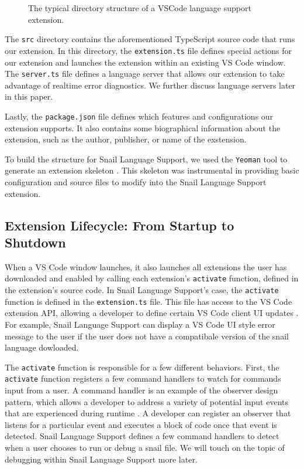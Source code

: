 \documentclass{article}
\begin{document}
\begin{figure}
\begin{center}
        \caption{
            \centering 
                The typical directory structure of a VSCode language support extension.
        }
        \label{fig:directory-structure}
    \end{center}
\end{figure}

The \lstinline{src} directory contains the aforementioned TypeScript source code that runs our extension. In this directory, the \lstinline{extension.ts} file defines special actions for our extension and launches the extension within an existing VS Code window. The \lstinline{server.ts} file defines a language server that allows our extension to take advantage of realtime error diagnostics. We further discuss language servers later in this paper. 

Lastly, the \lstinline{package.json} file defines which features and configurations our extension supports. It also contains some biographical information about the extension, such as the author, publisher, or name of the exstension. 

To build the structure for Snail Language Support, we used the \lstinline{Yeoman} tool to generate an extension skeleton \cite{Yeoman_2023}. This skeleton was instrumental in providing basic configuration and source files to modify into the Snail Language Support extension.

\subsection{Extension Lifecycle: From Startup to Shutdown}

When a VS Code window launches, it also launches all extensions the user has downloaded and enabled by calling each extension's \lstinline{activate} function, defined in the extension's source code. In Snail Language Support's case, the \lstinline{activate} function is defined in the \lstinline{extension.ts} file. This file has access to the VS Code extension API, allowing a developer to define certain VS Code client UI updates \cite{Microsoft_2023d}. For example, Snail Language Support can display a VS Code UI style error message to the user if the user does not have a compatibale version of the snail language dowloaded. 

The \lstinline{activate} function is responsible for a few different behaviors. First, the \lstinline{activate} function registers a few command handlers to watch for commands input from a user. A command handler is an example of the observer design pattern, which allows a developer to address a variety of potential input events that are experienced during runtime \cite{GangOfFour_1995}. A developer can register an observer that listens for a particular event and executes a block of code once that event is detected. Snail Language Support defines a few command handlers to detect when a user chooses to run or debug a snail file. We will touch on the topic of debugging within Snail Language Support more later. 
\end{document}
